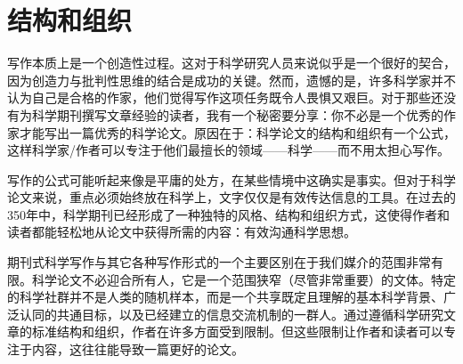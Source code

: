 \section*{结构和组织}
写作本质上是一个创造性过程。这对于科学研究人员来说似乎是一个很好的契合，因为创造力与批判性思维的结合是成功的关键。然而，遗憾的是，许多科学家并不认为自己是合格的作家，他们觉得写作这项任务既令人畏惧又艰巨。对于那些还没有为科学期刊撰写文章经验的读者，我有一个秘密要分享：你不必是一个优秀的作家才能写出一篇优秀的科学论文。原因在于：科学论文的结构和组织有一个公式，这样科学家/作者可以专注于他们最擅长的领域——科学——而不用太担心写作。

写作的公式可能听起来像是平庸的处方，在某些情境中这确实是事实。但对于科学论文来说，重点必须始终放在科学上，文字仅仅是有效传达信息的工具。在过去的350年中，科学期刊已经形成了一种独特的风格、结构和组织方式，这使得作者和读者都能轻松地从论文中获得所需的内容：有效沟通科学思想。

期刊式科学写作与其它各种写作形式的一个主要区别在于我们媒介的范围非常有限。科学论文不必迎合所有人，它是一个范围狭窄（尽管非常重要）的文体。特定的科学社群并不是人类的随机样本，而是一个共享既定且理解的基本科学背景、广泛认同的共通目标，以及已经建立的信息交流机制的一群人。通过遵循科学研究文章的标准结构和组织，作者在许多方面受到限制。但这些限制让作者和读者可以专注于内容，这往往能导致一篇更好的论文。

